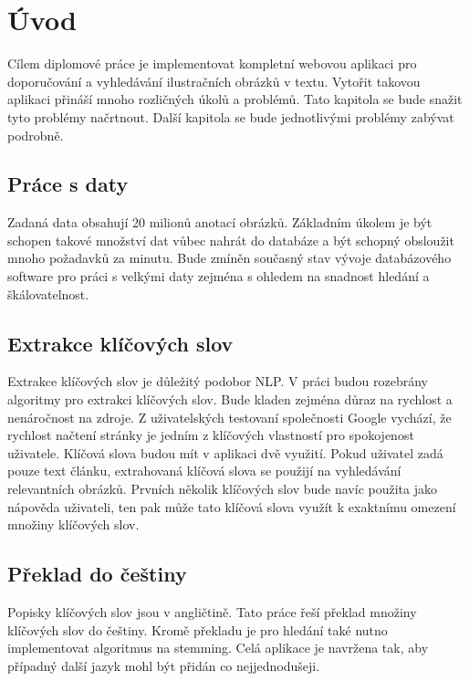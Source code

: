 \chapter{Úvod}

Cílem diplomové práce je implementovat kompletní webovou aplikaci pro doporučování a vyhledávání ilustračních obrázků v textu. Vytořit takovou aplikaci přináší mnoho rozličných úkolů a problémů. Tato kapitola se bude snažit tyto problémy načrtnout. Další kapitola se bude jednotlivými problémy zabývat podrobně.

\section{Práce s daty}

Zadaná data obsahují 20 milionů anotací obrázků. Základním úkolem je být schopen takové množství dat vůbec nahrát do databáze a být schopný obsloužit mnoho požadavků za minutu. Bude zmíněn současný stav vývoje databázového software pro práci s velkými daty zejména s ohledem na snadnost hledání a škálovatelnost.

\section{Extrakce klíčových slov}

Extrakce klíčových slov je důležitý podobor NLP. V práci budou rozebrány algoritmy pro extrakci klíčových slov. Bude kladen zejména důraz na rychlost a nenáročnost na zdroje. Z uživatelských testovaní společnosti Google vychází, že rychlost načtení stránky je jedním z klíčových vlastností pro spokojenost uživatele. Klíčová slova budou mít v aplikaci dvě využití. Pokud uživatel zadá pouze text článku, extrahovaná klíčová slova se použijí na vyhledávání relevantních obrázků. Prvních několik klíčových slov bude navíc použita jako nápověda uživateli, ten pak může tato klíčová slova využít k exaktnímu omezení množiny klíčových slov.

\section{Překlad do češtiny}

Popisky klíčových slov jsou v angličtině. Tato práce řeší překlad množiny klíčových slov do češtiny. Kromě překladu je pro hledání také nutno implementovat algoritmus na stemming. Celá aplikace je navržena tak, aby případný další jazyk mohl být přidán co nejjednodušeji.

